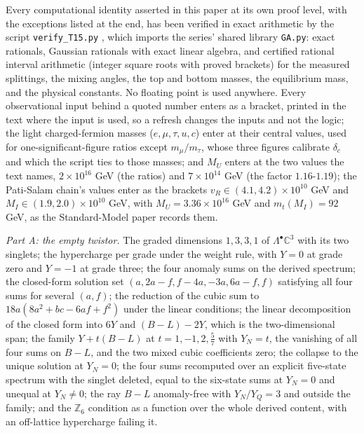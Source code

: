 \documentclass[11pt]{article}
\theoremstyle{definition}
\theoremstyle{plain}
\providecommand{\C}{}\renewcommand{\C}{\mathbb{C}}
\begin{document}
\label{c:note.neutrino.setting-machine-verification}
Every computational identity asserted in this paper at its own proof level, with the exceptions listed at the end, has been verified in exact arithmetic by the script \texttt{verify\_T15.py} \cite{ButlerVerifyT15}, which imports the series' shared library \texttt{GA.py}: exact rationals, Gaussian rationals with exact linear algebra, and certified rational interval arithmetic (integer square roots with proved brackets) for the measured splittings, the mixing angles, the top and bottom masses, the equilibrium mass, and the physical constants. No floating point is used anywhere. Every observational input behind a quoted number enters as a bracket, printed in the text where the input is used, so a refresh changes the inputs and not the logic; the light charged-fermion masses ($e, \mu, \tau, u, c$) enter at their central values, used for one-significant-figure ratios except $m_{\mu}/m_{\tau}$, whose three figures calibrate $\delta_{c}$ and which the script ties to those masses; and $M_{U}$ enters at the two values the text names, $2 \times 10^{16}$ GeV (the ratios) and $7 \times 10^{14}$ GeV (the factor $1.16$-$1.19$); the Pati-Salam chain's values enter as the brackets $v_{R} \in (4.1, 4.2) \times 10^{10}$ GeV and $M_{I} \in (1.9, 2.0) \times 10^{10}$ GeV, with $M_{U} = 3.36 \times 10^{16}$ GeV and $m_{t}(M_{I}) = 92$ GeV, as the Standard-Model paper records them.

\emph{Part A: the empty twistor.} The graded dimensions $1, 3, 3, 1$ of $\Lambda^{\bullet}\C^{3}$ with its two singlets; the hypercharge per grade under the weight rule, with $Y = 0$ at grade zero and $Y = -1$ at grade three; the four anomaly sums on the derived spectrum; the closed-form solution set $(a, 2a - f, f - 4a, -3a, 6a - f, f)$ satisfying all four sums for several $(a, f)$; the reduction of the cubic sum to $18a(8a^{2} + bc - 6af + f^{2})$ under the linear conditions; the linear decomposition of the closed form into $6Y$ and $(B - L) - 2Y$, which is the two-dimensional span; the family $Y + t(B - L)$ at $t = 1, -1, 2, \tfrac57$ with $Y_{N} = t$, the vanishing of all four sums on $B - L$, and the two mixed cubic coefficients zero; the collapse to the unique solution at $Y_{N} = 0$; the four sums recomputed over an explicit five-state spectrum with the singlet deleted, equal to the six-state sums at $Y_{N} = 0$ and unequal at $Y_{N} \neq 0$; the ray $B - L$ anomaly-free with $Y_{N}/Y_{Q} = 3$ and outside the family; and the $\mathbb{Z}_{6}$ condition as a function over the whole derived content, with an off-lattice hypercharge failing it.
\end{document}

